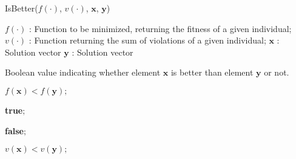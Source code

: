 \begin{algorithm*}
\caption{IsBetter($f(\cdot)$, $v(\cdot)$, $\bm{x}$, $\bm{y}$)}
\label{alg:IsBetter}
\begin{algorithmic}[1]


\INPUT{}
\Statex $f(\cdot)$ : Function to be minimized, returning the fitness of a given individual;
\Statex $v(\cdot)$ : Function returning the sum of violations of a given individual;
\Statex $\bm{x}$ : Solution vector
\Statex $\bm{y}$ : Solution vector
\Statex

\OUTPUT{}
\Statex Boolean value indicating whether element $\bm{x}$ is better than element $\bm{y}$ or not.
\Statex
\Statex

\State \Return $f(\bm{x}) < f(\bm{y});$
\Statex

\State \Return \textbf{true}$;$
\Statex

\State \Return \textbf{false}$;$
\Statex
\EndIf

\Statex
\State \Return $v(\bm{x}) < v(\bm{y});$




\end{algorithmic}
\end{algorithm*}